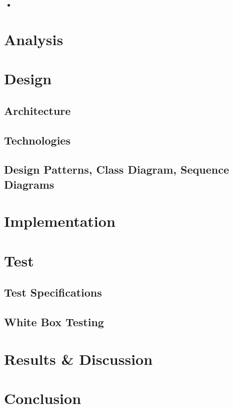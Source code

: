 \documentclass[paper=a4, fontsize=12pt,DIV=14]{scrartcl}    %
\begin{document}
        			\begin{itemize}
        				\item 
        			\end{itemize}


    \newpage
        \section{Analysis}


    \newpage
        \section{Design}
        	\subsection{Architecture}
        	\subsection{Technologies}
        	\subsection{Design Patterns, Class Diagram, Sequence Diagrams}


    \newpage
        \section{Implementation}



    \newpage
        \section{Test}
        	\subsection{Test Specifications}
        	\subsection{White Box Testing}



    \newpage
        \section{Results \& Discussion}



    \newpage
        \section{Conclusion}



\end{document}
